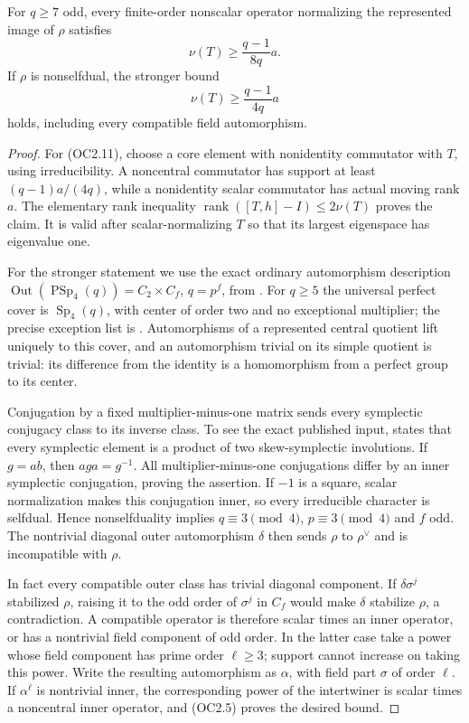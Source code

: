 \begin{lemma}
\label{D-OC2-03}
For $q\ge7$ odd, every finite-order nonscalar operator normalizing
the represented image of $\rho$ satisfies
\[
 \nu(T)\ge\frac{q-1}{8q}a.                                   \tag{OC2.11}
\]
If $\rho$ is nonselfdual, the stronger bound
\[
 \nu(T)\ge\frac{q-1}{4q}a                                   \tag{OC2.12}
\]
holds, including every compatible field automorphism.
\end{lemma}

\begin{proof}
For (OC2.11), choose a core element with nonidentity commutator
with $T$, using irreducibility. A noncentral commutator has
support at least $(q-1)a/(4q)$, while a nonidentity scalar
commutator has actual moving rank $a$. The elementary rank
inequality $\operatorname{rank}([T,h]-I)\le2\nu(T)$ proves
the claim. It is valid after scalar-normalizing $T$ so that
its largest eigenspace has eigenvalue one.

For the stronger statement we use the exact ordinary automorphism
description $\operatorname{Out}(\operatorname{PSp}_4(q))
=C_2\times C_f$, $q=p^f$, from
\cite[\S2.2.2, Table~2.1, author p.~14]{HES:LiXia2022}.
For $q\ge5$ the universal perfect cover is $\operatorname{Sp}_4(q)$,
with center of order two and no exceptional multiplier; the precise
exception list is \cite[Chapter~5, Table~1, p.~35]{BI:HHM}.
Automorphisms of a represented central quotient lift uniquely to
this cover, and an automorphism trivial on its simple quotient is
trivial: its difference from the identity is a homomorphism from
a perfect group to its center.

Conjugation by a fixed multiplier-minus-one matrix sends every
symplectic conjugacy class to its inverse class. To see the exact
published input, \cite[Theorem~1, author p.~1]{OC2:Vinroot2004}
states that every symplectic element is a product of two
skew-symplectic involutions. If $g=ab$, then $aga=g^{-1}$.
All multiplier-minus-one conjugations differ by an inner
symplectic conjugation, proving the assertion. If $-1$ is a
square, scalar normalization makes this conjugation inner, so
every irreducible character is selfdual. Hence nonselfduality
implies $q\equiv3\pmod4$, $p\equiv3\pmod4$ and $f$ odd.
The nontrivial diagonal outer automorphism $\delta$ then sends
$\rho$ to $\rho^\vee$ and is incompatible with $\rho$.

In fact every compatible outer class has trivial diagonal
component. If $\delta\sigma^j$ stabilized $\rho$, raising it to
the odd order of $\sigma^j$ in $C_f$ would make $\delta$
stabilize $\rho$, a contradiction. A compatible operator is
therefore scalar times an inner operator, or has a nontrivial
field component of odd order. In the latter case take a power
whose field component has prime order $\ell\ge3$; support
cannot increase on taking this power. Write the resulting
automorphism as $\alpha$, with field part $\sigma$ of order
$\ell$. If $\alpha^\ell$ is nontrivial inner, the corresponding
power of the intertwiner is scalar times a noncentral inner
operator, and (OC2.5) proves the desired bound.


\end{proof}
